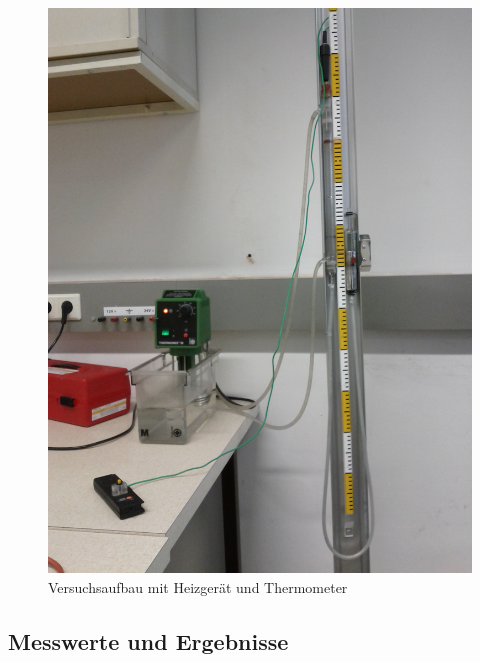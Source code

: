 \documentclass[12pt,a4paper]{article}
\begin{document}
\begin{multicols}{2}
\begin{figure}[H]
	\centering
	\includegraphics[scale=0.22]{./figure/gas_therm_aufbau.png}
	\caption{Versuchsaufbau mit Heizgerät und Thermometer}
	\label{fig:gas_therm_aufbau}
\end{figure}


\subsection{Messwerte und Ergebnisse}

\end{multicols}
\end{document}
